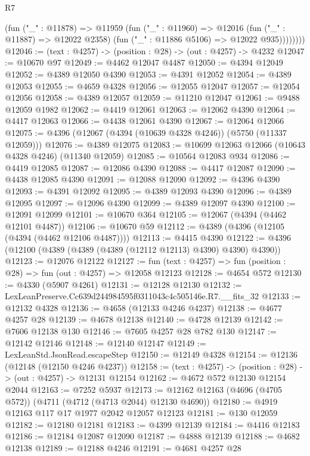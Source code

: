 \begin{lexlean}{R7}
\begin{coremodule}
              (fun ("_" : @11878) =>
              @11959
                (fun ("_" : @11960) =>
                @12016
                  (fun ("_" : @11887) => @12022 @2358)
                  (fun ("_" : @11886 @5106) => @12022 @935))))))))
@12046 := (text : @4257) -> (position : @28) -> (out : @4257) -> @4232
@12047 := @10670 @97
@12049 := @4462 @12047 @4487
@12050 := @4394 @12049
@12052 := @4389 @12050 @4390
@12053 := @4391 @12052
@12054 := @4389 @12053
@12055 := @4659 @4328
@12056 := @12055 @12047
@12057 := @12054 @12056
@12058 := @4389 @12057
@12059 := @11210 @12047
@12061 := @9488 @12059 @1982
@12062 := @4419 @12061
@12063 := @12062 @4390
@12064 := @4417 @12063
@12066 := @4438 @12061 @4390
@12067 := @12064 @12066
@12075 := @4396 (@12067 (@4394 (@10639 @4328 @4246)) (@5750 (@11337 @12059)))
@12076 := @4389 @12075
@12083 := @10699 @12063 @12066 (@10643 @4328 @4246) (@11340 @12059)
@12085 := @10564 @12083 @934
@12086 := @4419 @12085
@12087 := @12086 @4390
@12088 := @4417 @12087
@12090 := @4438 @12085 @4390
@12091 := @12088 @12090
@12092 := @4396 @4390
@12093 := @4391 @12092
@12095 := @4389 @12093 @4390
@12096 := @4389 @12095
@12097 := @12096 @4390
@12099 := @4389 @12097 @4390
@12100 := @12091 @12099
@12101 := @10670 @364
@12105 := @12067 (@4394 (@4462 @12101 @4487))
@12106 := @10670 @59
@12112 := @4389 (@4396 (@12105 (@4394 (@4462 @12106 @4487))))
@12113 := @4415 @4390
@12122 := @4396 (@12100 (@4389 (@4389 (@4389 (@12112 @12113) @4390) @4390) @4390))
@12123 := @12076 @12122
@12127 := fun (text : @4257) => fun (position : @28) => fun (out : @4257) => @12058 @12123
@12128 := @4654 @572
@12130 := @4330 (@5907 @4261)
@12131 := @12128 @12130
@12132 := LexLeanPreserve.Cc639d244984595f0311043c4c505146e.R7.__fits_32
@12133 := @12132 @4328
@12136 := @4658 (@12133 @4246 @4237)
@12138 := @4677 @4257 @28
@12139 := @4678 @12138
@12140 := @4728 @12139
@12142 := @7606 @12138 @130
@12146 := @7605 @4257 @28 @782 @130
@12147 := @12142 @12146
@12148 := @12140 @12147
@12149 := LexLeanStd.JsonRead.escapeStep
@12150 := @12149 @4328
@12154 := @12136 (@12148 (@12150 @4246 @4237))
@12158 := (text : @4257) -> (position : @28) -> (out : @4257) -> @12131 @12154
@12162 := @4672 @572 @12130 @12154 @2044
@12163 := @7252 @5937
@12173 := @12162 @12163 (@4696 (@4705 @572)) (@4711 (@4712 (@4713 @2044) @12130 @4690))
@12180 := @4919 @12163 @117 @17 @1977 @2042 @12057 @12123
@12181 := @130 @12059
@12182 := @12180 @12181
@12183 := @4399 @12139
@12184 := @4416 @12183
@12186 := @12184 @12087 @12090
@12187 := @4888 @12139
@12188 := @4682 @12138
@12189 := @12188 @4246
@12191 := @4681 @4257 @28

\end{coremodule}
\end{lexlean}
